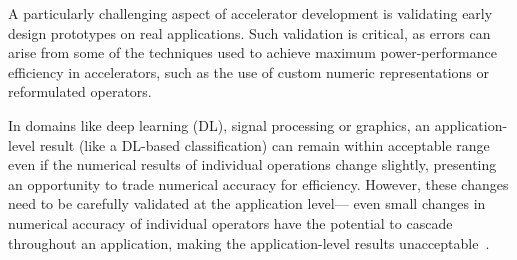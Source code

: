 A particularly challenging aspect of accelerator development
  is validating early design prototypes
  on real applications.
Such validation is critical,
  as errors can arise from
  some of the techniques used
  to achieve maximum power-performance efficiency
  in accelerators,
  such as the use of custom numeric representations
  or reformulated operators.
\iffalse %
This is unfortunate as
  end-to-end testing reveals aberrant behaviors
  from accumulated errors that per-operator unit tests miss and
  catches accelerator design issues early,
  saving substantial effort for downstream engineering tasks.
Several aspects of accelerator development
  frustrate early end-to-end testing efforts.
Testing an accelerator design requires both
  specialized compiler support to
  find and offload workload operations to the accelerator
  and also
  specialized simulator support to
  quickly and cheaply evaluate the prototype design.
Developing such specialized support is often challenging.
\fi
In domains like deep learning (DL), signal processing or graphics,
  an application-level result
  (like a DL-based classification)
  can remain within acceptable range
  even if the numerical results
  of individual operations change slightly,
  presenting an opportunity to trade numerical accuracy
  for efficiency.
However, these changes need to be 
  carefully validated 
  at the application level---%
  even small changes in numerical accuracy
  of individual operators
  have the potential to cascade throughout an application,
  making the application-level results unacceptable~\cite{zorn2021rounding}.
